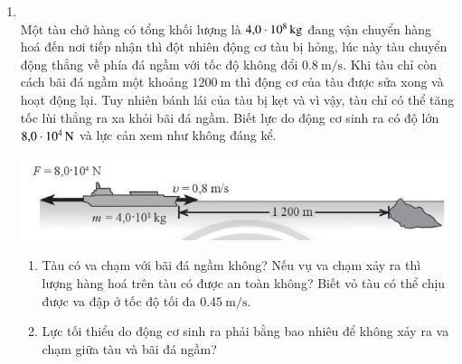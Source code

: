 \begin{enumerate}[label=\bfseries Bài \arabic*:,leftmargin=1.5cm]
\item {}\\
Một tàu chở hàng có tổng khối lượng là $\SI{4.0E8}{\kilogram}$ đang vận chuyển hàng hoá đến nơi tiếp nhận thì đột nhiên động cơ tàu bị hỏng, lúc này tàu chuyển động thẳng về phía đá ngầm với tốc độ không đổi $\SI{0.8}{\meter/\second}$. Khi tàu chỉ còn cách bãi đá ngầm một khoảng $\SI{1200}{\meter}$ thì động cơ của tàu được sửa xong và hoạt động lại. Tuy nhiên bánh lái của tàu bị kẹt và vì vậy, tàu chỉ có thể tăng tốc lùi thẳng ra xa khỏi bãi đá ngầm. Biết lực do động cơ sinh ra có độ lớn $\SI{8.0E4}{\newton}$ và lực cản xem như không đáng kể.
\begin{center}
	\includegraphics[width=0.7\linewidth]{../figs/VN10-2023-PH-TP016-P-1}
\end{center}
\begin{enumerate}[label=\alph*)]
	\item Tàu có va chạm với bãi đá ngầm không? Nếu vụ va chạm xảy ra thì lượng hàng hoá trên tàu có được an toàn không? Biết vỏ tàu có thể chịu được va đập ở tốc độ tối đa $\SI{0.45}{\meter/\second}$.
	\item Lực tối thiểu do động cơ sinh ra phải bằng bao nhiêu để không xảy ra va chạm giữa tàu và bãi đá ngầm?
\end{enumerate}



\end{enumerate}